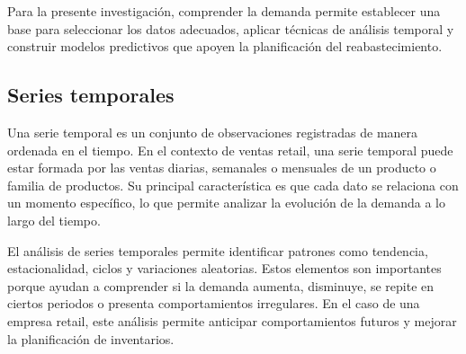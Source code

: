 Para la presente investigación, comprender la demanda permite establecer una base para seleccionar los datos adecuados, aplicar técnicas de análisis temporal y construir modelos predictivos que apoyen la planificación del reabastecimiento.





\subsection{Series temporales}

Una serie temporal es un conjunto de observaciones registradas de manera ordenada en el tiempo. En el contexto de ventas retail, una serie temporal puede estar formada por las ventas diarias, semanales o mensuales de un producto o familia de productos. Su principal característica es que cada dato se relaciona con un momento específico, lo que permite analizar la evolución de la demanda a lo largo del tiempo.

El análisis de series temporales permite identificar patrones como tendencia, estacionalidad, ciclos y variaciones aleatorias. Estos elementos son importantes porque ayudan a comprender si la demanda aumenta, disminuye, se repite en ciertos periodos o presenta comportamientos irregulares. En el caso de una empresa retail, este análisis permite anticipar comportamientos futuros y mejorar la planificación de inventarios.


